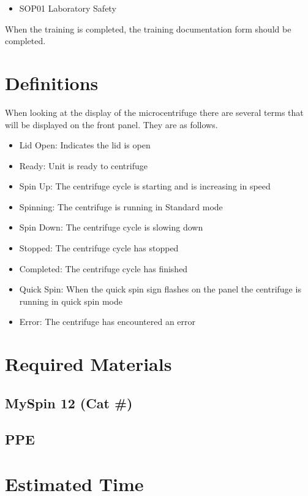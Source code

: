 \documentclass[12pt]{../SOP3_beta}\usepackage[]{graphicx}\usepackage[]{color}
\begin{document}
\begin{itemize}
  \item SOP01 Laboratory Safety
\end{itemize}

When the training is completed, the training documentation form should be completed.


\section{Definitions}


\NP When looking at the display of the microcentrifuge there are several terms that will be displayed on the front panel. They are as follows.

\begin{itemize}
  \item Lid Open: Indicates the lid is open
  \item Ready: Unit is ready to centrifuge 
  \item Spin Up: The centrifuge cycle is starting and is increasing in speed
  \item Spinning: The centrifuge is running in Standard mode 
  \item Spin Down: The centrifuge cycle is slowing down
  \item Stopped: The centrifuge cycle has stopped
  \item Completed: The centrifuge cycle has finished
  \item Quick Spin: When the quick spin sign flashes on the panel the centrifuge is running in quick spin mode
  \item Error: The centrifuge has encountered an error
\end{itemize}

\section{Required Materials}

\subsection{MySpin 12 (Cat \#)}
\subsection{PPE}

\section{Estimated Time}
\end{document}
